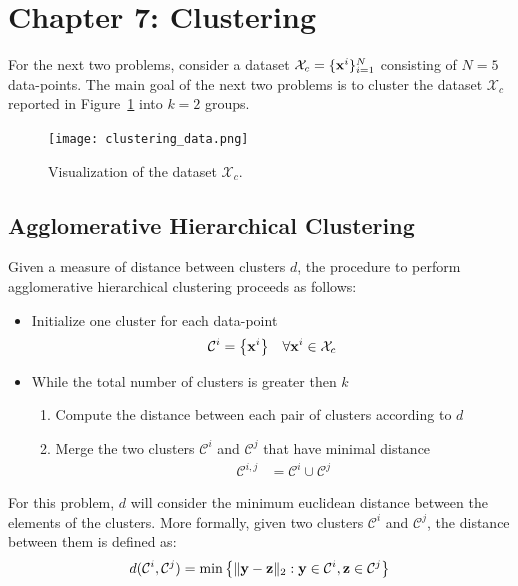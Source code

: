 \documentclass[11pt,a4paper]{article}
\begin{document}
\section{Chapter 7: Clustering}
For the next two problems, consider a dataset $\mathcal{X}_c=\{{\bf x}^i\}_{i=1}^N$ consisting of $N=5$  data-points.
The main goal of the next two problems is to cluster the dataset $\mathcal{X}_c$ reported in Figure~\ref{fig:clustering} into $k=2$ groups.

\begin{figure}[!ht]
	\centering
	\texttt{[image: clustering\_data.png]}
	\caption{Visualization of the dataset $\mathcal{X}_c$.}
	\label{fig:clustering}
\end{figure}

\subsection{Agglomerative Hierarchical Clustering}
Given a measure of distance between clusters $d$, the procedure to perform agglomerative hierarchical clustering proceeds as follows:
\begin{itemize}
	\item  Initialize one cluster for each data-point
		\begin{align*}
			\mathcal{C}^i &= \left\{{\bf x}^i \right\}& \forall {\bf x}^i \in \mathcal{X}_c
		\end{align*}
	\item While the total number of clusters is greater then $k$
	\begin{enumerate}
		\item Compute the distance between each pair of clusters according to $d$
		\item Merge the two clusters $\mathcal{C}^i$ and $\mathcal{C}^j$ that have minimal distance
		\begin{align*}
			\mathcal{C}^{i,j} &= \mathcal{C}^i \cup \mathcal{C}^j
		\end{align*}
	\end{enumerate}
\end{itemize}
For this problem, $d$ will consider the minimum euclidean distance between the elements of the clusters.
More formally, given two clusters $\mathcal{C}^i$ and $\mathcal{C}^j$, the distance between them is defined as:
\begin{align}
	d(\mathcal{C}^i, \mathcal{C}^j) = \min \left\{ \|{\bf y}-{\bf z}\|_2 : {\bf y}\in\mathcal{C}^i, {\bf z}\in\mathcal{C}^j \right\}
	\label{eq:distance}
\end{align}
\end{document}
